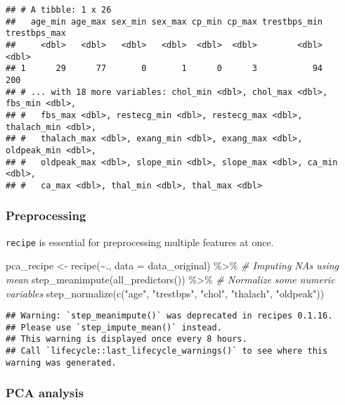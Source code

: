 \documentclass[
]{book}
\newenvironment{Shaded}{\begin{snugshade}}{\end{snugshade}}
\newcommand{\AttributeTok}[1]{\textcolor[rgb]{0.77,0.63,0.00}{#1}}
\newcommand{\CommentTok}[1]{\textcolor[rgb]{0.56,0.35,0.01}{\textit{#1}}}
\newcommand{\FunctionTok}[1]{\textcolor[rgb]{0.00,0.00,0.00}{#1}}
\newcommand{\NormalTok}[1]{#1}
\newcommand{\OtherTok}[1]{\textcolor[rgb]{0.56,0.35,0.01}{#1}}
\newcommand{\SpecialCharTok}[1]{\textcolor[rgb]{0.00,0.00,0.00}{#1}}
\newcommand{\StringTok}[1]{\textcolor[rgb]{0.31,0.60,0.02}{#1}}
\begin{document}
\begin{verbatim}
## # A tibble: 1 x 26
##   age_min age_max sex_min sex_max cp_min cp_max trestbps_min trestbps_max
##     <dbl>   <dbl>   <dbl>   <dbl>  <dbl>  <dbl>        <dbl>        <dbl>
## 1      29      77       0       1      0      3           94          200
## # ... with 18 more variables: chol_min <dbl>, chol_max <dbl>, fbs_min <dbl>,
## #   fbs_max <dbl>, restecg_min <dbl>, restecg_max <dbl>, thalach_min <dbl>,
## #   thalach_max <dbl>, exang_min <dbl>, exang_max <dbl>, oldpeak_min <dbl>,
## #   oldpeak_max <dbl>, slope_min <dbl>, slope_max <dbl>, ca_min <dbl>,
## #   ca_max <dbl>, thal_min <dbl>, thal_max <dbl>
\end{verbatim}

\hypertarget{preprocessing}{%
\subsubsection{Preprocessing}\label{preprocessing}}

\texttt{recipe} is essential for preprocessing multiple features at once.

\begin{Shaded}
\begin{Highlighting}[]
\NormalTok{pca\_recipe }\OtherTok{\textless{}{-}} \FunctionTok{recipe}\NormalTok{(}\SpecialCharTok{\textasciitilde{}}\NormalTok{., }\AttributeTok{data =}\NormalTok{ data\_original) }\SpecialCharTok{\%\textgreater{}\%}
  \CommentTok{\# Imputing NAs using mean}
  \FunctionTok{step\_meanimpute}\NormalTok{(}\FunctionTok{all\_predictors}\NormalTok{()) }\SpecialCharTok{\%\textgreater{}\%}
  \CommentTok{\# Normalize some numeric variables}
  \FunctionTok{step\_normalize}\NormalTok{(}\FunctionTok{c}\NormalTok{(}\StringTok{"age"}\NormalTok{, }\StringTok{"trestbps"}\NormalTok{, }\StringTok{"chol"}\NormalTok{, }\StringTok{"thalach"}\NormalTok{, }\StringTok{"oldpeak"}\NormalTok{))}
\end{Highlighting}
\end{Shaded}

\begin{verbatim}
## Warning: `step_meanimpute()` was deprecated in recipes 0.1.16.
## Please use `step_impute_mean()` instead.
## This warning is displayed once every 8 hours.
## Call `lifecycle::last_lifecycle_warnings()` to see where this warning was generated.
\end{verbatim}

\hypertarget{pca-analysis}{%
\subsubsection{PCA analysis}\label{pca-analysis}}
\end{document}
